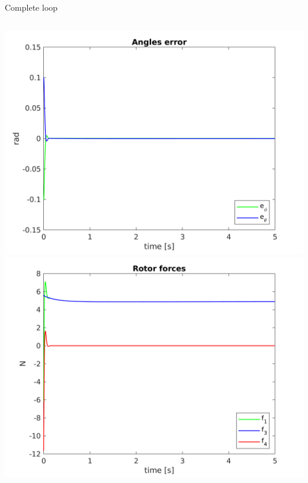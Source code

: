 \begin{frame}[fragile]{Complete loop}
  \begin{columns}
    \includegraphics[width=\textwidth]{../report/Images/Angles_error}
    \includegraphics[width=\textwidth]{../report/Images/Forces}
  \end{columns}
\end{frame}

